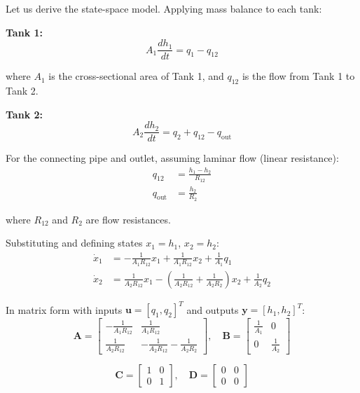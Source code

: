 Let us derive the state-space model. Applying mass balance to each tank:

\textbf{Tank 1:}
\begin{equation}
A_1 \frac{dh_1}{dt} = q_1 - q_{12}
\end{equation}

where $A_1$ is the cross-sectional area of Tank 1, and $q_{12}$ is the flow from Tank 1 to Tank 2.

\textbf{Tank 2:}
\begin{equation}
A_2 \frac{dh_2}{dt} = q_2 + q_{12} - q_{\text{out}}
\end{equation}

For the connecting pipe and outlet, assuming laminar flow (linear resistance):
\begin{align}
q_{12} &= \frac{h_1 - h_2}{R_{12}} \\
q_{\text{out}} &= \frac{h_2}{R_2}
\end{align}

where $R_{12}$ and $R_2$ are flow resistances.

Substituting and defining states $x_1 = h_1$, $x_2 = h_2$:
\begin{align}
\dot{x}_1 &= -\frac{1}{A_1 R_{12}} x_1 + \frac{1}{A_1 R_{12}} x_2 + \frac{1}{A_1} q_1 \\
\dot{x}_2 &= \frac{1}{A_2 R_{12}} x_1 - \left(\frac{1}{A_2 R_{12}} + \frac{1}{A_2 R_2}\right) x_2 + \frac{1}{A_2} q_2
\end{align}

In matrix form with inputs $\mathbf{u} = [q_1, q_2]^T$ and outputs $\mathbf{y} = [h_1, h_2]^T$:
\begin{equation}
\mathbf{A} = \begin{bmatrix} -\frac{1}{A_1 R_{12}} & \frac{1}{A_1 R_{12}} \\[6pt] \frac{1}{A_2 R_{12}} & -\frac{1}{A_2 R_{12}} - \frac{1}{A_2 R_2} \end{bmatrix}, \quad
\mathbf{B} = \begin{bmatrix} \frac{1}{A_1} & 0 \\[6pt] 0 & \frac{1}{A_2} \end{bmatrix}
\end{equation}

\begin{equation}
\mathbf{C} = \begin{bmatrix} 1 & 0 \\ 0 & 1 \end{bmatrix}, \quad \mathbf{D} = \begin{bmatrix} 0 & 0 \\ 0 & 0 \end{bmatrix}
\end{equation}

